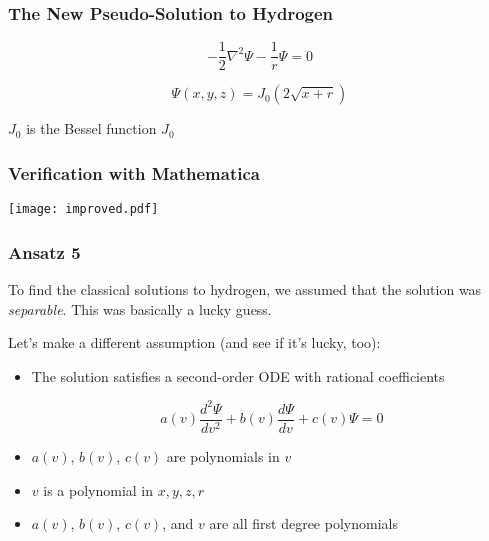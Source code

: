 \documentclass[11pt]{beamer}
\begin{document}
\begin{frame}
\frametitle{The New Pseudo-Solution to Hydrogen}

\[ - \frac{1}{2} \nabla^2 \Psi - \frac{1}{r} \Psi = 0 \]

\[ \Psi(x,y,z) = J_0(2\sqrt{x+r}) \]

\vskip 0.5in

$J_0$ is the Bessel function $J_0$

\end{frame}

\begin{frame}
\frametitle{Verification with Mathematica}
\texttt{[image: improved.pdf]}
\end{frame}

\begin{frame}
\frametitle{Ansatz 5}

To find the classical solutions to hydrogen, we assumed that the solution was {\it separable}.
This was basically a lucky guess.

\vskip 12pt

Let's make a different assumption (and see if it's lucky, too):

\vskip 12pt

\begin{itemize}
\item The solution satisfies a second-order ODE with rational coefficients

\[ a(v) \frac{d^2 \Psi}{dv^2} + b(v) \frac{d \Psi}{dv} + c(v) \Psi = 0 \]

\item $a(v)$, $b(v)$, $c(v)$ are polynomials in $v$

\item $v$ is a polynomial in $x,y,z,r$

\item $a(v)$, $b(v)$, $c(v)$, and $v$ are all first degree polynomials
\end{itemize}
\end{frame}
\end{document}
